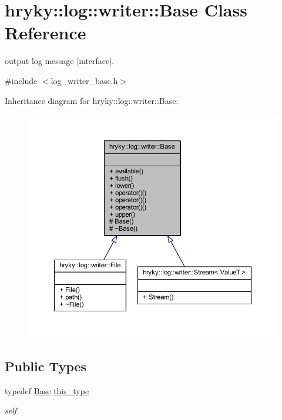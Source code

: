 \hypertarget{classhryky_1_1log_1_1writer_1_1_base}{\section{hryky\-:\-:log\-:\-:writer\-:\-:Base Class Reference}
\label{classhryky_1_1log_1_1writer_1_1_base}
}


output log message \mbox{[}interface\mbox{]}.  




{\ttfamily \#include $<$log\-\_\-writer\-\_\-base.\-h$>$}



Inheritance diagram for hryky\-:\-:log\-:\-:writer\-:\-:Base\-:
\nopagebreak
\begin{figure}[H]
\begin{center}
\leavevmode
\includegraphics[width=350pt]{classhryky_1_1log_1_1writer_1_1_base__inherit__graph}
\end{center}
\end{figure}
\subsection*{Public Types}
\begin{DoxyCompactItemize}
\item 
\hypertarget{classhryky_1_1log_1_1writer_1_1_base_a55cd662911ba97eee18ff8a04ba132eb}{typedef \hyperlink{classhryky_1_1log_1_1writer_1_1_base}{Base} \hyperlink{classhryky_1_1log_1_1writer_1_1_base_a55cd662911ba97eee18ff8a04ba132eb}{this\-\_\-type}}\label{classhryky_1_1log_1_1writer_1_1_base_a55cd662911ba97eee18ff8a04ba132eb}

\begin{DoxyCompactList}\small\item\em self \end{DoxyCompactList}\end{DoxyCompactItemize}
